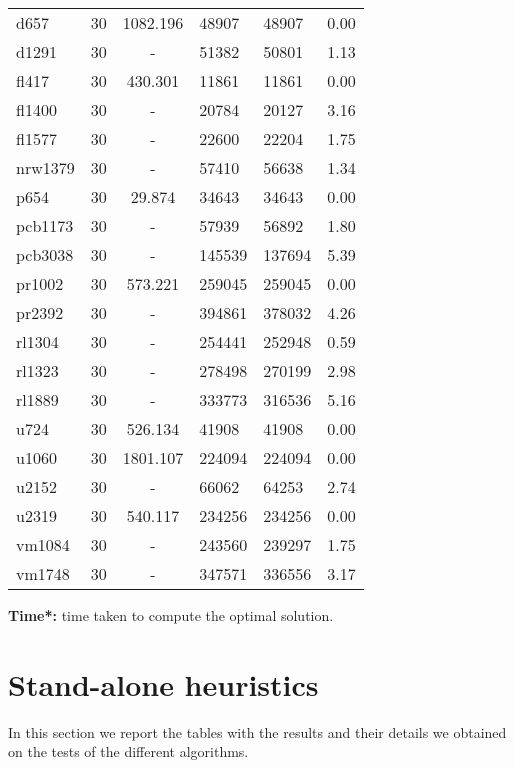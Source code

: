 \begin{center}
\begin{longtable}{lccllr}
			d657 & 30 & 1082.196 & 48907 & 48907 & 0.00 \\
			d1291 & 30 & - & 51382 & 50801 & 1.13  \\
			fl417 & 30 & 430.301 & 11861 & 11861 & 0.00\\
			fl1400 & 30 & - & 20784 & 20127 &  3.16 \\
			fl1577 & 30 & - & 22600 & 22204 &  1.75\\
			nrw1379 & 30 & - & 57410 & 56638 & 1.34 \\
			p654 & 30 & 29.874 & 34643 & 34643 & 0.00 \\
			pcb1173 & 30 & - & 57939 & 56892 & 1.80  \\
			pcb3038 & 30 & - & 145539 & 137694 & 5.39  \\
			pr1002 & 30 & 573.221 & 259045 & 259045 & 0.00  \\
			pr2392 & 30 & - & 394861 & 378032 & 4.26 \\
			rl1304 & 30 & - &254441 & 252948 & 0.59  \\
			rl1323 & 30  & - & 278498 & 270199 &  2.98 \\
			rl1889 & 30 & - & 333773 & 316536 & 5.16 \\
			u724 & 30 & 526.134 & 41908 & 41908 & 0.00 \\
			u1060 & 30 & 1801.107 & 224094 & 224094 & 0.00  \\
			u2152 & 30 & - & 66062 & 64253 & 2.74 \\
			u2319 & 30 & 540.117 & 234256 & 234256 & 0.00 \\
			vm1084 & 30 & - & 243560 & 239297 & 1.75  \\
			vm1748 & 30 & - &347571 & 336556 & 3.17 \\

\end{longtable}
\textbf{Time*:} time taken to compute the optimal solution.
\end{center}


\newpage
\section{Stand-alone heuristics} 
In this section we report the tables with the results and their details we obtained on the tests of the different algorithms.\\

\setlength\LTleft{\fill}


